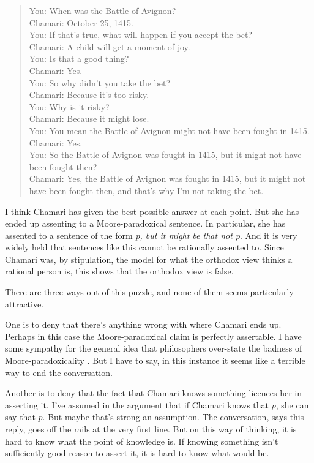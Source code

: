 \documentclass[11pt,]{book}
\begin{document}
\begin{quote}
You: When was the Battle of Avignon?\\
Chamari: October 25, 1415.\\
You: If that's true, what will happen if you accept the bet?\\
Chamari: A child will get a moment of joy.\\
You: Is that a good thing?\\
Chamari: Yes.\\
You: So why didn't you take the bet?\\
Chamari: Because it's too risky.\\
You: Why is it risky?\\
Chamari: Because it might lose.\\
You: You mean the Battle of Avignon might not have been fought in 1415.\\
Chamari: Yes.\\
You: So the Battle of Avignon was fought in 1415, but it might not have been fought then?\\
Chamari: Yes, the Battle of Avignon was fought in 1415, but it might not have been fought then, and that's why I'm not taking the bet.
\end{quote}

I think Chamari has given the best possible answer at each point. But she has ended up assenting to a Moore-paradoxical sentence. In particular, she has assented to a sentence of the form \emph{p, but it might be that not p}. And it is very widely held that sentences like this cannot be rationally assented to. Since Chamari was, by stipulation, the model for what the orthodox view thinks a rational person is, this shows that the orthodox view is false.

There are three ways out of this puzzle, and none of them seems particularly attractive.

One is to deny that there's anything wrong with where Chamari ends up. Perhaps in this case the Moore-paradoxical claim is perfectly assertable. I have some sympathy for the general idea that philosophers over-state the badness of Moore-paradoxicality \citep{MaitraWeatherson2010}. But I have to say, in this instance it seems like a terrible way to end the conversation.

Another is to deny that the fact that Chamari knows something licences her in asserting it. I've assumed in the argument that if Chamari knows that \(p\), she can say that \(p\). But maybe that's strong an assumption. The conversation, says this reply, goes off the rails at the very first line. But on this way of thinking, it is hard to know what the point of knowledge is. If knowing something isn't sufficiently good reason to assert it, it is hard to know what would be.
\end{document}

